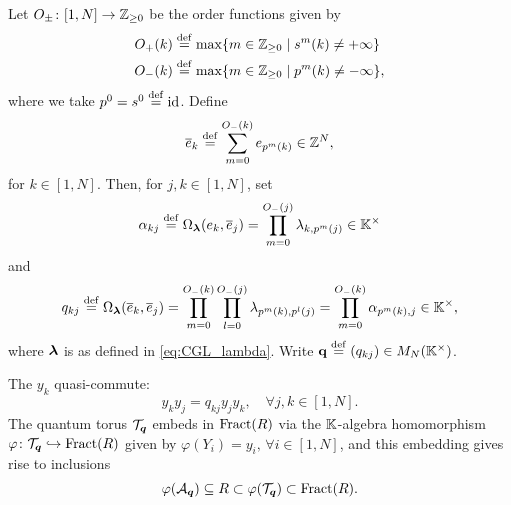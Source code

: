 Let $O_{\pm} \colon [1, N] \to \mathbb{Z}_{\geq 0}$ be the order
functions given by
\begin{align*}
	O_{+}(k) & \overset{\mathrm{def}}{=} \max\{m \in \mathbb{Z}_{\geq 0} \mid s^m(k) \neq + \infty\}   \\
	O_{-}(k) & \overset{\mathrm{def}}{=} \max\{m \in \mathbb{Z}_{\geq 0} \mid p^m(k) \neq - \infty\} ,
\end{align*}
%
where we take $p^0 = s^0 \overset{\mathrm{def}}{=} \operatorname{id}$. Define
\begin{equation*}
	\overline{e}_k \overset{\mathrm{def}}{=} \sum_{m=0}^{O_{-}(k)} e_{p^m(k)} \in \mathbb{Z}^N,
\end{equation*}
%
%
for $k \in [1, N]$. Then, for $j,k \in [1, N]$, set
\begin{equation*}
	\alpha_{kj} \overset{\mathrm{def}}{=} \Omega_{\boldsymbol{\lambda}}(e_k, \overline{e}_j) = \prod_{m=0}^{O_{-}(j)}\lambda_{k, p^m(j)} \in \mathbb{K}^\times
\end{equation*}
%
and
\begin{equation}\label{eq:q_from_lambda}
	q_{kj} \overset{\mathrm{def}}{=} \Omega_{\boldsymbol{\lambda}}(\overline{e}_k, \overline{e}_j) = \prod_{m=0}^{O_{-}(k)}\prod_{l=0}^{O_{-}(j)}\lambda_{p^m(k),p^l(j)} = \prod_{m=0}^{O_{-}(k)}\alpha_{p^m (k),j} \in \mathbb{K}^\times,
\end{equation}
%
where $\boldsymbol{\lambda}$ is as defined in \cref{eq:CGL_lambda}. Write $\mathbf{q} \overset{\mathrm{def}}{=} (q_{kj}) \in
	M_N(\mathbb{K}^\times)$.
\begin{proposition}\label{prop:y_quantum_torus}
	The $y_k$ quasi-commute:
	\begin{equation}\label{eq:y_quasi_commute}
		y_k y_j = q_{kj}y_jy_k, \quad \forall j, k \in [1, N].
	\end{equation}
	The quantum torus $\mathcal{T}_{\boldsymbol{q}}$ embeds in $\operatorname{Fract}(R)$ via the $\mathbb{K}$-algebra
	homomorphism $\varphi \colon \mathcal{T}_{\boldsymbol{q}} \hookrightarrow \operatorname{Fract}(R)$ given by $\varphi(Y_i) =
		y_i,\,\forall i \in [1, N]$, and this embedding gives rise to inclusions
	\begin{equation*}
		\varphi(\mathcal{A}_{\boldsymbol{q}}) \subseteq R \subset \varphi(\mathcal{T}_{\boldsymbol{q}}) \subset \operatorname{Fract}(R).
	\end{equation*}
\end{proposition}

